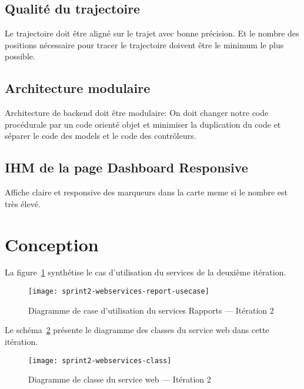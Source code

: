 \subsection{Qualité du trajectoire}

Le trajectoire doit être aligné sur le trajet avec bonne précision. Et le
nombre des positions nécessaire pour tracer le trajectoire doivent être le
minimum le plus possible.

\subsection{Architecture modulaire}

Architecture de backend doit être modulaire: On doit changer notre code
procédurale par un code orienté objet et minimiser la duplication du code et
séparer le code des models et le code des contrôleurs.

\subsection{IHM de la page Dashboard Responsive}

Affiche claire et responsive des marqueurs dans la carte meme si le nombre est
très élevé.

\section{Conception}

La figure~\ref{fig:sprint2-webservices-report-usecase} synthétise le cas
d'utilisation du services  de la deuxième itération.

\begin{figure}[htbp]
    \centering
    \texttt{[image: sprint2-webservices-report-usecase]}
    \caption{Diagramme de case d'utilisation du services Rapports --- Itération 2}
\label{fig:sprint2-webservices-report-usecase}
\end{figure}

Le schéma~\ref{fig:sprint2-webservices-class} présente le diagramme des classes
du service web dans cette itération.

\begin{figure}[htbp]
    \centering
    \texttt{[image: sprint2-webservices-class]}
    \caption{Diagramme de classe du service web --- Itération 2}
\label{fig:sprint2-webservices-class}
\end{figure}


